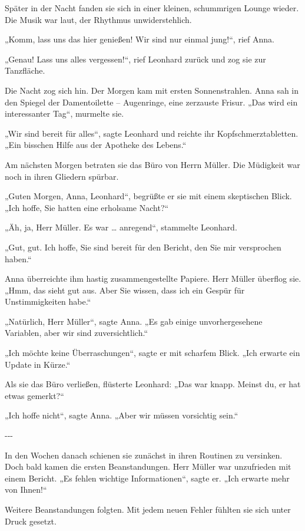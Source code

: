 \documentclass[
]{article}
\begin{document}
Später in der Nacht fanden sie sich in einer kleinen, schummrigen Lounge wieder. Die Musik war laut, der Rhythmus unwiderstehlich.

„Komm, lass uns das hier genießen! Wir sind nur einmal jung!{\kern0pt}``, rief Anna.

„Genau! Lass uns alles vergessen!{\kern0pt}``, rief Leonhard zurück und zog sie zur Tanzfläche.

Die Nacht zog sich hin. Der Morgen kam mit ersten Sonnenstrahlen. Anna sah in den Spiegel der Damentoilette -- Augenringe, eine zerzauste Frisur. „Das wird ein interessanter Tag``, murmelte sie.

„Wir sind bereit für alles``, sagte Leonhard und reichte ihr Kopfschmerztabletten. „Ein bisschen Hilfe aus der Apotheke des Lebens.``

Am nächsten Morgen betraten sie das Büro von Herrn Müller. Die Müdigkeit war noch in ihren Gliedern spürbar.

„Guten Morgen, Anna, Leonhard``, begrüßte er sie mit einem skeptischen Blick. „Ich hoffe, Sie hatten eine erholsame Nacht?{\kern0pt}``

„Äh, ja, Herr Müller. Es war \ldots{} anregend``, stammelte Leonhard.

„Gut, gut. Ich hoffe, Sie sind bereit für den Bericht, den Sie mir versprochen haben.``

Anna überreichte ihm hastig zusammengestellte Papiere. Herr Müller überflog sie. „Hmm, das sieht gut aus. Aber Sie wissen, dass ich ein Gespür für Unstimmigkeiten habe.``

„Natürlich, Herr Müller``, sagte Anna. „Es gab einige unvorhergesehene Variablen, aber wir sind zuversichtlich.``

„Ich möchte keine Überraschungen``, sagte er mit scharfem Blick. „Ich erwarte ein Update in Kürze.``

Als sie das Büro verließen, flüsterte Leonhard: „Das war knapp. Meinst du, er hat etwas gemerkt?{\kern0pt}``

„Ich hoffe nicht``, sagte Anna. „Aber wir müssen vorsichtig sein.``

-\/-\/-

In den Wochen danach schienen sie zunächst in ihren Routinen zu versinken. Doch bald kamen die ersten Beanstandungen. Herr Müller war unzufrieden mit einem Bericht. „Es fehlen wichtige Informationen``, sagte er. „Ich erwarte mehr von Ihnen!{\kern0pt}``

Weitere Beanstandungen folgten. Mit jedem neuen Fehler fühlten sie sich unter Druck gesetzt.
\end{document}
